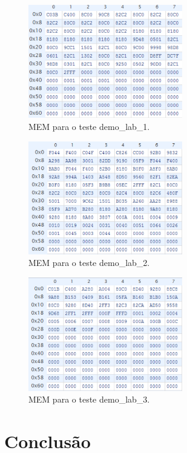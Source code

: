 \documentclass[a4paper]{article}
\begin{document}
		\begin{figure}[Hp]
			\centering
			\includegraphics[width=0.6\textwidth]{img/imem_1}
			\caption{MEM para o teste demo\_lab\_1.}
			\label{fig:imem_1}
		\end{figure}
		\begin{figure}[Hp]
			\centering
			\includegraphics[width=0.6\textwidth]{img/imem_2}
			\caption{MEM para o teste demo\_lab\_2.}
			\label{fig:imem_2}
		\end{figure}
		\begin{figure}[Hp]
			\centering
			\includegraphics[width=0.6\textwidth]{img/imem_3}
			\caption{MEM para o teste demo\_lab\_3.}
			\label{fig:imem_3}
		\end{figure}
		
	\section{Conclusão}
	
\end{document}
